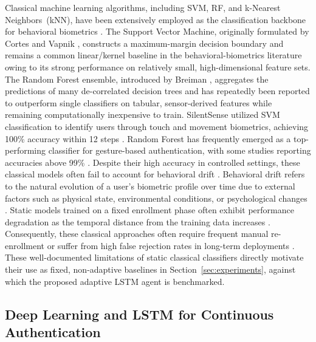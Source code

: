 \documentclass[3p,times,procedia]{elsarticle}
\begin{document}
Classical machine learning algorithms, including SVM, RF, and
k-Nearest Neighbors~(kNN), have been extensively employed as
the classification backbone for behavioral biometrics
\cite{incel_dakota_2021}. The Support Vector Machine, originally
formulated by Cortes and Vapnik \cite{cortes_supportvector_1995},
constructs a maximum-margin decision boundary and remains a
common linear/kernel baseline in the behavioral-biometrics
literature owing to its strong performance on relatively small,
high-dimensional feature sets. The Random Forest ensemble,
introduced by Breiman \cite{breiman_random_2001}, aggregates the
predictions of many de-correlated decision trees and has
repeatedly been reported to outperform single classifiers on
tabular, sensor-derived features while remaining
computationally inexpensive to train. SilentSense utilized SVM
classification to identify users through touch and movement
biometrics, achieving 100\% accuracy within 12 steps
\cite{bo_silentsense_2013}. Random Forest has frequently emerged as a
top-performing classifier for gesture-based authentication,
with some studies reporting accuracies above 99\%
\cite{abuhamad_autosen_2020}. Despite their
high accuracy in controlled settings, these classical models
often fail to account for behavioral drift \cite{stylios_behavioral_2021}.
Behavioral drift refers to the natural evolution of a user's
biometric profile over time due to external factors such as
physical state, environmental conditions, or psychological
changes \cite{verma_data-driven_2022}. Static models trained on a fixed
enrollment phase often exhibit performance degradation as the
temporal distance from the training data increases
\cite{frank_touchalytics_2013}. Consequently, these classical approaches
often require frequent manual re-enrollment or suffer from high
false rejection rates in long-term deployments \cite{stylios_behavioral_2021}.
These well-documented limitations of static classical
classifiers directly motivate their use as fixed, non-adaptive
baselines in Section~\ref{sec:experiments}, against which the
proposed adaptive LSTM agent is benchmarked.

\subsection{Deep Learning and LSTM for Continuous Authentication}
\end{document}
